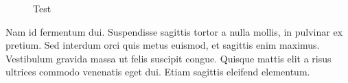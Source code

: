 \documentclass[sigconf]{acmart}
\begin{document}
\begin{figure}[h]
\centering
{}
\caption{Test}
\end{figure}

Nam id fermentum dui. Suspendisse sagittis tortor a nulla mollis, in
pulvinar ex pretium. Sed interdum orci quis metus euismod, et sagittis
enim maximus. Vestibulum gravida massa ut felis suscipit
congue. Quisque mattis elit a risus ultrices commodo venenatis eget
dui. Etiam sagittis eleifend elementum.
\end{document}
